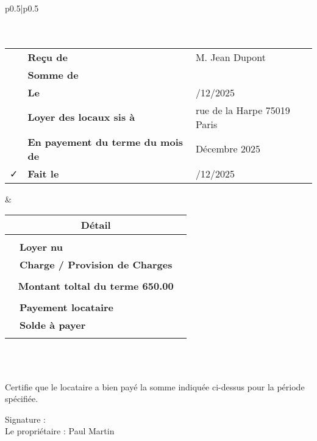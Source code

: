 \documentclass{article}
\begin{document}
\begin{tabular}{p{}|p{}}
	\hline 	
	\\
		\\
	\hline 
	\\
	\begin{tabular}{c>{\raggedleft\arraybackslash}p{}>{\raggedright\arraybackslash}p{}}
		\faFile{} &  \textbf{Reçu de} & M. Jean Dupont\\
		\faMoney & 	\textbf{Somme de}	 & 650.00 \EURdig\\
		\faCalendar & \textbf{Le} & 09/12/2025\\
		\faMapMarker & \textbf{Loyer des locaux sis à } & 6 rue de la Harpe 75019 Paris\\
		\faPencil & \textbf{En payement du terme du mois de} & Décembre 2025\\
		\faCheck & \textbf{Fait le} & 18/12/2025\\
	\end{tabular}
	& \setlength{\arrayrulewidth}{2pt} %
	\begin{tabular}{c>{\raggedleft\arraybackslash}p{}>{\raggedright\arraybackslash}p{}}	
		\multicolumn{3}{c}{\bf Détail}\\
		\hline \\
		\faHome{} & \textbf{Loyer nu} & 580.0 \EURdig	\\
		\faBolt{} & \textbf{Charge / Provision de Charges} &  70.0 \EURdig	\\
		\\
		\multicolumn{3}{c}{\bf Montant toltal du terme 650.00 \EURdig }\\
		\hline \\
		\faMoney{} & \textbf{Payement locataire} & 600.00 \EURdig	\\
		\faExclamationTriangle{} & \textbf{Solde à payer} &  50.00 \EURdig	\\
		&\\
	\end{tabular}\\
	\hline
    \\
    \hline
\end{tabular}






\vspace{1cm}

\noindent
Certifie que le locataire a bien payé la somme indiquée ci-dessus pour la période spécifiée.

\vspace{2cm}

\noindent
Signature : \\
Le propriétaire : Paul Martin
\end{document}
